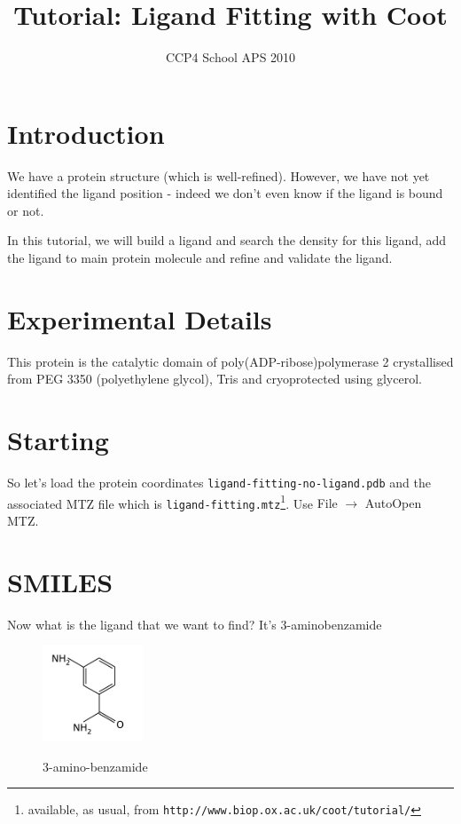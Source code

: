 \documentclass{article}
\title{Tutorial: Ligand Fitting with Coot}
\author{CCP4 School APS 2010}
\begin{document}
\maketitle
 

\section{Introduction}

We have a protein structure (which is well-refined). However, we have
not yet identified the ligand position - indeed we don't even know if
the ligand is bound or not.  

In this tutorial, we will build a ligand
and search the density for this ligand, add the ligand to main protein
molecule and refine and validate the ligand.

\section{Experimental Details}

 This protein is the catalytic domain of poly(ADP-ribose)polymerase 2
 crystallised from PEG 3350 (polyethylene glycol), Tris and
 cryoprotected using glycerol.

\section{Starting}

 So let's load the protein coordinates
 \texttt{ligand-fitting-no-ligand.pdb} and the associated MTZ file
 which is \texttt{ligand-fitting.mtz}\footnote{available, as usual, 
from \texttt{\small http://www.biop.ox.ac.uk/coot/tutorial/}}.  
Use \textsf{File $\rightarrow$ AutoOpen MTZ}.

\section{SMILES}

 Now what is the ligand that we want to find? It's 3-aminobenzamide

\begin{figure}[htbp]
  \begin{center}
    \leavevmode
    \includegraphics[width=30mm]{3-amino-benzamide-2.png}
    \caption{3-amino-benzamide}{}
    \label{fig:3-amino-benzamide}
  \end{center}
\end{figure}
\end{document}
